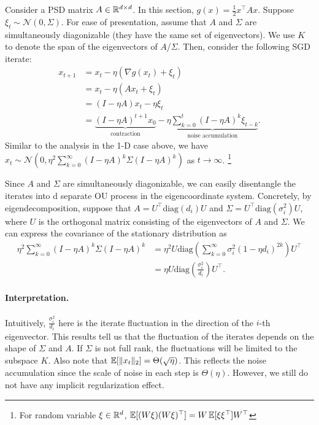Consider a PSD matrix $A \in \mathbb R^{d\times d}$. In this section, $g(x) = \frac{1}{2}x^\top A x$. Suppose $\xi_t \sim \mathcal{N}(0, \Sigma)$. For ease of presentation, assume that $A$ and $\Sigma$ are simultaneously diagonizable (they have the same set of eigenvectors). We use $K$ to denote the span of the eigenvectors of $A$/$\Sigma$. Then, consider the following SGD iterate:
\begin{align}
x_{t+1} &= x_t - \eta(\nabla g(x_{t}) + \xi_t)\\
&= x_t - \eta(Ax_t + \xi_t)\\
&= (I- \eta A)x_t - \eta\xi_t\\
&= \underbrace{(I- \eta A)^{t+1} x_0}_{\text{contraction}} - \underbrace{\eta\sum_{k=0}^{t} (I- \eta A)^{k}\xi_{t-k}}_{\text{noise accumulation}}.
\end{align}
Similar to the analysis in the 1-D case above, we have $x_t \sim \mathcal{N}(0, \eta^2\sum_{k=0}^{\infty} (I- \eta A)^{k}\Sigma (I- \eta A)^{k})$ as $t \rightarrow \infty$. \footnote{For random variable $\xi\in \mathbb R^d$, $\operatorname*{\mathbb{E}}[(W\xi)(W\xi)^\top] = W\operatorname*{\mathbb{E}}[\xi\xi^\top]W^\top$}

Since $A$ and $\Sigma$ are simultaneously diagonizable, we can easily disentangle the iterates into d separate OU process in the eigencoordinate system. Concretely, by eigendecomposition, suppose that $A = U^\top \text{diag}(d_i) U$ and $\Sigma = U^\top \text{diag}(\sigma_i^2) U$, where $U$ is the orthogonal matrix consisting of the eigenvectors of $A$ and $\Sigma$. We can express the covariance of the stationary distribution as
\begin{align}
\eta^2\sum_{k=0}^{\infty} (I- \eta A)^{k}\Sigma (I- \eta A)^{k} &= \eta^2 U\text{diag}\left(\sum_{k=0}^{\infty}\sigma_i^2(1-\eta d_i)^{2k}\right)U^\top\\
&= \eta U\text{diag}\left(\frac{\sigma_i^2}{d_i}\right)U^\top.
\end{align}
\paragraph{Interpretation.} Intuitively, $\frac{\sigma_i^2}{d_i}$ here is the iterate fluctuation in the direction of the $i$-th eigenvector. This results tell us that the fluctuation of the iterates depends on the shape of $\Sigma$ and $A$. If $\Sigma$ is not full rank, the fluctuations will be limited to the subspace $K$. Also note that $\operatorname*{\mathbb{E}}[\|x_t\|_2] = \Theta(\sqrt{\eta})$. This reflects the noise accumulation since the scale of noise in each step is $\Theta({\eta})$. However, we still do not have any implicit regularization effect. 

